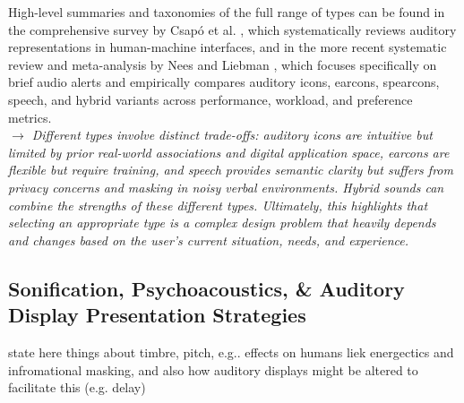 High-level summaries and taxonomies of the full range of \glspl{type} can be found in the comprehensive survey by Csapó et al. \cite{Csapo_13_ModernAuditoryDisplayTypesOverview}, which systematically reviews auditory representations in human-machine interfaces, and in the more recent systematic review and meta-analysis by Nees and Liebman \cite{Nees_23_AuditoryDisplayTypesHCI}, which focuses specifically on brief audio alerts and empirically compares auditory icons, earcons, spearcons, speech, and hybrid variants across performance, workload, and preference metrics.\\

\textit{$\rightarrow$ Different \glspl{type} involve distinct trade-offs: auditory icons are intuitive but limited by prior real-world associations and digital application space, earcons are flexible but require training, and speech provides semantic clarity but suffers from privacy concerns and masking in noisy verbal environments. Hybrid sounds can combine the strengths of these different \glspl{type}. Ultimately, this highlights that selecting an appropriate \gls{type} is a complex design problem that heavily depends and changes based on the user's current situation, needs, and experience.}

\subsection{Sonification, Psychoacoustics, \& Auditory Display Presentation Strategies}
state here things about timbre, pitch, e.g.. effects on humans liek energectics and infromational masking,
and also how auditory displays might be altered to facilitate this (e.g. delay)

